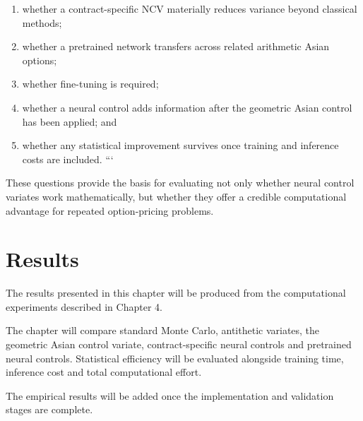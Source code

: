 \documentclass[12pt,a4paper]{report}
\begin{document}
\begin{enumerate}[label=\arabic*.]

```
\item whether a contract-specific NCV materially reduces variance beyond classical methods;

\item whether a pretrained network transfers across related arithmetic Asian options;

\item whether fine-tuning is required;

\item whether a neural control adds information after the geometric Asian control has been applied; and

\item whether any statistical improvement survives once training and inference costs are included.
```

\end{enumerate}

These questions provide the basis for evaluating not only whether neural control variates work mathematically, but whether they offer a credible computational advantage for repeated option-pricing problems.


\chapter{Results}

The results presented in this chapter will be produced from the computational experiments described in Chapter 4.

The chapter will compare standard Monte Carlo, antithetic variates, the geometric Asian control variate, contract-specific neural controls and pretrained neural controls. Statistical efficiency will be evaluated alongside training time, inference cost and total computational effort.

The empirical results will be added once the implementation and validation stages are complete.
\end{document}
